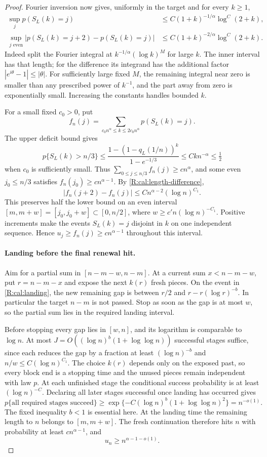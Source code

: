 \begin{proof}
Fourier inversion now gives, uniformly in the target and for every $k\ge1$,
\begin{align}
 \sup_j p(S_L(k)=j)&\le C(1+k)^{-1/\alpha}\log^C(2+k),
 \label{R:cal:length-atom}\\
 \sup_{j\text{ even}}|p(S_L(k)=j+2)-p(S_L(k)=j)|
 &\le C(1+k)^{-2/\alpha}\log^C(2+k).
 \label{R:cal:length-difference}
\end{align}
Indeed split the Fourier integral at
$k^{-1/\alpha}(\log k)^M$ for large $k$. The inner interval has that
length; for the difference its integrand has the additional factor
$|e^{i\theta}-1|\le|\theta|$. For sufficiently large fixed $M$, the
remaining integral near zero is smaller than any prescribed power of
$k^{-1}$, and the part away from zero is exponentially small. Increasing
the constants handles bounded $k$.

For a small fixed $c_0>0$, put
\[
 f_n(j)=\sum_{c_0n^\alpha\le k\le2c_0n^\alpha}p(S_L(k)=j).
\]
The upper deficit bound gives
\[
 p\{S_L(k)>n/3\}
 \le\frac{1-(1-q_L(1/n))^k}{1-e^{-1/3}}
 \le Ck n^{-\alpha}\le\tfrac12
\]
when $c_0$ is sufficiently small. Thus
$\sum_{0\le j\le n/3}f_n(j)\ge c n^\alpha$, and some even
$j_0\le n/3$ satisfies $f_n(j_0)\ge c n^{\alpha-1}$.
By \eqref{R:cal:length-difference},
\[
 |f_n(j+2)-f_n(j)|\le Cn^{\alpha-2}(\log n)^{C_1}.
\]
This preserves half the lower bound on an even interval
$[m,m+w]=[j_0,j_0+w]\subset[0,n/2]$, where
$w\ge c'n(\log n)^{-C_1}$. Positive increments make the events
$S_L(k)=j$ disjoint in $k$ on one independent sequence. Hence
$u_j\ge f_n(j)\ge c n^{\alpha-1}$ throughout this interval.

\paragraph{Landing before the final renewal hit.}
Aim for a partial sum in $[n-m-w,n-m]$. At a current sum
$x<n-m-w$, put $r=n-m-x$ and expose the next $k(r)$ fresh pieces.
On the event in \eqref{R:cal:landing}, the new remaining gap is between
$r/2$ and $r-r(\log r)^{-b}$. In particular the target $n-m$ is not
passed. Stop as soon as the gap is at most $w$, so the partial sum lies
in the required landing interval.

Before stopping every gap lies in $[w,n]$, and its logarithm is comparable
to $\log n$. At most
$J=O((\log n)^b(1+\log\log n))$ successful stages suffice, since each
reduces the gap by a fraction at least $(\log n)^{-b}$ and
$n/w\le C(\log n)^{C_1}$. The choice $k(r)$ depends only on the exposed
past, so every block end is a stopping time and the unused pieces remain
independent with law $p$. At each unfinished stage the conditional success
probability is at least $(\log n)^{-C}$. Declaring all later stages
successful once landing has occurred gives
\[
 p\{\text{all required stages succeed}\}
 \ge\exp\{-C(\log n)^b(1+\log\log n)^2\}=n^{-o(1)}.
\]
The fixed inequality $b<1$ is essential here. At the landing time the
remaining length to $n$ belongs to $[m,m+w]$. The fresh continuation
therefore hits $n$ with probability at least $c n^{\alpha-1}$, and
\[
 u_n\ge n^{\alpha-1-o(1)}.
\]


\end{proof}
